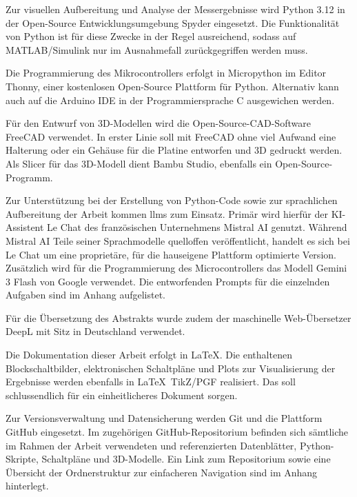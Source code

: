 Zur visuellen Aufbereitung und Analyse der Messergebnisse wird Python 3.12 in der Open-Source Entwicklungsumgebung Spyder eingesetzt. Die Funktionalität von Python ist für diese Zwecke in der Regel ausreichend, sodass auf MATLAB/Simulink nur im Ausnahmefall zurückgegriffen werden muss.\par
\medskip

Die Programmierung des Mikrocontrollers erfolgt in Micropython im Editor Thonny, einer kostenlosen Open-Source Plattform für Python. Alternativ kann auch auf die Arduino IDE in der Programmiersprache C ausgewichen werden.\par
\medskip

Für den Entwurf von 3D-Modellen wird die Open-Source-CAD-Software FreeCAD verwendet. In erster Linie soll mit FreeCAD ohne viel Aufwand eine Halterung oder ein Gehäuse für die Platine entworfen und 3D gedruckt werden. Als Slicer für das 3D-Modell dient Bambu Studio, ebenfalls ein Open-Source-Programm.\par
\medskip


Zur Unterstützung bei der Erstellung von Python-Code sowie zur sprachlichen Aufbereitung der Arbeit kommen \glspl{llm} zum Einsatz. Primär wird hierfür der KI-Assistent Le Chat des französischen Unternehmens Mistral AI genutzt. Während Mistral AI Teile seiner Sprachmodelle quelloffen veröffentlicht, handelt es sich bei Le Chat um eine proprietäre, für die hauseigene Plattform optimierte Version. Zusätzlich wird für die Programmierung des Microcontrollers das Modell Gemini 3 Flash von Google verwendet. Die entworfenden Prompts für die einzelnden Aufgaben sind im Anhang aufgelistet.\par
\medskip

Für die Übersetzung des Abstrakts wurde zudem der maschinelle Web-Übersetzer DeepL mit Sitz in Deutschland verwendet.\par
\medskip 

Die Dokumentation dieser Arbeit erfolgt in \LaTeX. Die enthaltenen Blockschaltbilder, elektronischen Schaltpläne und Plots zur Visualisierung der Ergebnisse werden ebenfalls in \LaTeX\ TikZ/PGF realisiert. Das soll schlussendlich für ein einheitlicheres Dokument sorgen. \par
\medskip

Zur Versionsverwaltung und Datensicherung werden Git und die Plattform GitHub eingesetzt. Im zugehörigen GitHub-Repositorium befinden sich sämtliche im Rahmen der Arbeit verwendeten und referenzierten Datenblätter, Python-Skripte, Schaltpläne und 3D-Modelle. Ein Link zum Repositorium sowie eine Übersicht der Ordnerstruktur zur einfacheren Navigation sind im Anhang hinterlegt.\par
\medskip


%


